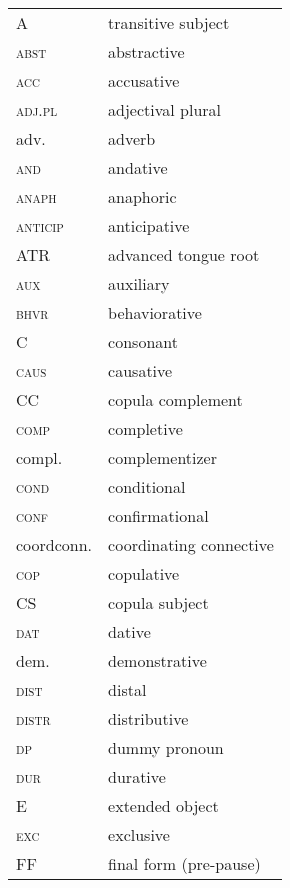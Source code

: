 


\begin{tabularx}{.48\textwidth}{lQ} 
A					&	 transitive subject \\
\textsc{abst}		&	 abstractive \\
\textsc{acc}        &    accusative \\
\textsc{adj.pl}		&	 {adjectival} plural \\
adv.				&	 {adverb} \\
\textsc{and}		&	 an{dative} \\
\textsc{anaph}		&	 {anaphoric} \\
\textsc{anticip}	&	 anticipative \\
{ATR}					&	 advanced tongue root \\
\textsc{aux}		&	 auxiliary \\
\textsc{bhvr}		&	 behaviorative \\
C					&	 consonant \\
\textsc{caus}		&	 {causative} \\
CC					&	 {copula} {complement} \\
\textsc{comp}		&	 completive \\
compl.				&	 {complementizer} \\
\textsc{cond}		&	 conditional \\
\textsc{conf}		& 	 confirmational \\
coordconn.			&	 coordinating connective \\
\textsc{cop}		&	 copulative \\
CS					&	 {copula} subject \\
\textsc{dat}        &    {dative} \\
dem.				&	 demonstrative \\
\textsc{dist}		&	 distal \\
\textsc{distr}		&	 distributive \\
\textsc{dp}			&	 {dummy pronoun} \\
\textsc{dur}		&	 durative \\
E					&	 extended object \\
\textsc{exc}		&	 exclusive \\
FF					&	 final form (pre-pause)\\
\end{tabularx} 
